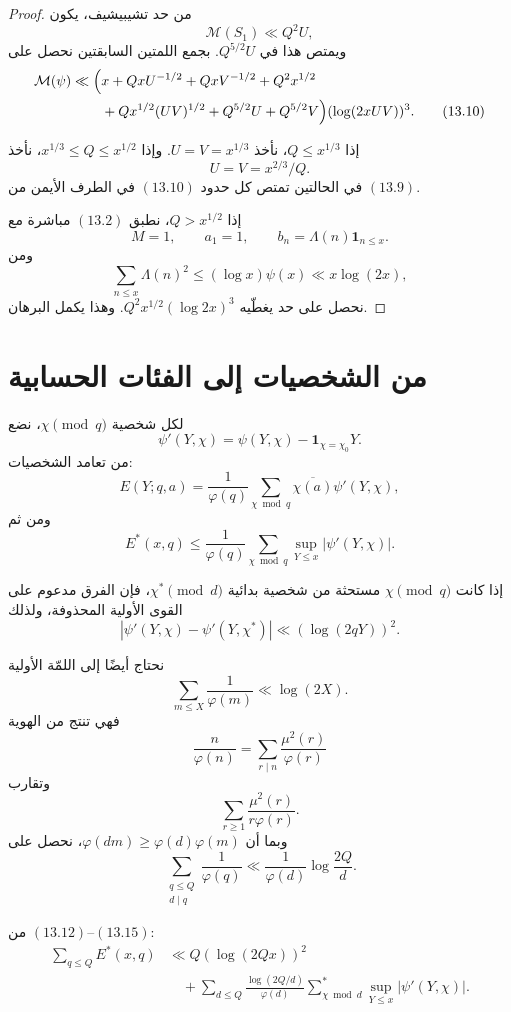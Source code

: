 \begin{proof}
من حد تشيبيشيف، يكون
\[
\mathcal M(S_1)\ll Q^2U,
\]
ويمتص هذا في \(Q^{5/2}U\). بجمع اللمتين السابقتين نحصل على
\begin{align*}
\mathcal M(\psi)
\ll
\Bigl(&x+QxU^{-1/2}+QxV^{-1/2}+Q^2x^{1/2}\\
&+Qx^{1/2}(UV)^{1/2}+Q^{5/2}U+Q^{5/2}V\Bigr)
(\log(2xUV))^3.
\tag{13.10}
\end{align*}

إذا \(Q\le x^{1/3}\)، نأخذ \(U=V=x^{1/3}\). وإذا
\(x^{1/3}\le Q\le x^{1/2}\)، نأخذ
\[
U=V=x^{2/3}/Q.
\]
في الحالتين تمتص كل حدود \((13.10)\) في الطرف الأيمن من \((13.9)\).

إذا \(Q>x^{1/2}\)، نطبق \((13.2)\) مباشرة مع
\[
M=1,
\qquad a_1=1,
\qquad b_n=\Lambda(n)\mathbf1_{n\le x}.
\]
ومن
\[
\sum_{n\le x}\Lambda(n)^2
\le(\log x)\psi(x)
\ll x\log(2x),
\]
نحصل على حد يغطّيه \(Q^2x^{1/2}(\log 2x)^3\). وهذا يكمل البرهان.
\end{proof}

\section{من الشخصيات إلى الفئات الحسابية}

لكل شخصية \(\chi\pmod q\)، نضع
\[
\psi'(Y,\chi)
=
\psi(Y,\chi)-\mathbf1_{\chi=\chi_0}Y.
\]
من تعامد الشخصيات:
\[
E(Y;q,a)
=
\frac1{\varphi(q)}
\sum_{\chi\bmod q}
\overline{\chi(a)}\psi'(Y,\chi),
\tag{13.11}
\]
ومن ثم
\[
E^*(x,q)
\le
\frac1{\varphi(q)}
\sum_{\chi\bmod q}
\sup_{Y\le x}|\psi'(Y,\chi)|.
\tag{13.12}
\]

إذا كانت \(\chi\pmod q\) مستحثة من شخصية بدائية \(\chi^*\pmod d\)، فإن
الفرق مدعوم على القوى الأولية المحذوفة، ولذلك
\[
|\psi'(Y,\chi)-\psi'(Y,\chi^*)|
\ll(\log(2qY))^2.
\tag{13.13}
\]

نحتاج أيضًا إلى اللمّة الأولية
\[
\sum_{m\le X}\frac1{\varphi(m)}\ll\log(2X).
\tag{13.14}
\]
فهي تنتج من الهوية
\[
\frac n{\varphi(n)}
=
\sum_{r\mid n}\frac{\mu^2(r)}{\varphi(r)}
\]
وتقارب
\[
\sum_{r\ge1}\frac{\mu^2(r)}{r\varphi(r)}.
\]
وبما أن \(\varphi(dm)\ge\varphi(d)\varphi(m)\)، نحصل على
\[
\sum_{\substack{q\le Q\\d\mid q}}
\frac1{\varphi(q)}
\ll
\frac1{\varphi(d)}\log\frac{2Q}{d}.
\tag{13.15}
\]

من \((13.12)\)--\((13.15)\):
\begin{align*}
\sum_{q\le Q}E^*(x,q)
&\ll
Q(\log(2Qx))^2\\
&\quad+
\sum_{d\le Q}
\frac{\log(2Q/d)}{\varphi(d)}
\sum_{\chi\bmod d}^{*}
\sup_{Y\le x}|\psi'(Y,\chi)|.
\tag{13.16}
\end{align*}

